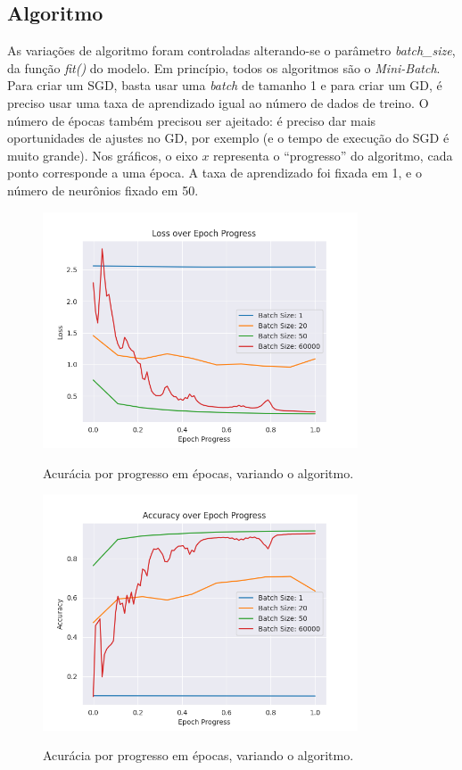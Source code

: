 \documentclass[a4paper]{article}
\begin{document}
\subsection{Algoritmo}%
\label{sub:Algoritmo}

As variações de algoritmo foram controladas alterando-se o parâmetro \textit{batch\_size}, da função \textit{fit()} do modelo. Em princípio, todos os algoritmos são o \textit{Mini-Batch}. Para criar um SGD, basta usar uma \textit{batch} de tamanho 1 e para criar um GD, é preciso usar uma taxa de aprendizado igual ao número de dados de treino. O número de épocas também precisou ser ajeitado: é preciso dar mais oportunidades de ajustes no GD, por exemplo (e o tempo de execução do SGD é muito grande). Nos gráficos, o eixo $x$ representa o “progresso” do algoritmo, cada ponto corresponde a uma época. A taxa de aprendizado foi fixada em 1, e o número de neurônios fixado em 50.

\begin{figure}[H]
  \begin{center}
  {\includegraphics[height=7cm]{./images/Loss_over_Epoch_Progress.png}}
  \end{center}
  \caption{Acurácia por progresso em épocas, variando o algoritmo. \label{fig:lep}}
\end{figure}

\begin{figure}[H]
  \begin{center}
  {\includegraphics[height=7cm]{./images/Accuracy_over_Epoch_Progress.png}}
  \end{center}
  \caption{Acurácia por progresso em épocas, variando o algoritmo.\label{fig:aep}}
\end{figure}
\end{document}
